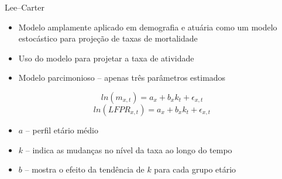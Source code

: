 \documentclass{beamer}
\begin{document}
\begin{frame}{Lee--Carter}
	\begin{itemize}
		\item{Modelo amplamente aplicado em demografia e atuária como um modelo estocástico para projeção de taxas de mortalidade}
		\item{Uso do modelo para projetar a taxa de atividade}
		\item{Modelo parcimonioso -- apenas três parâmetros estimados}
	\end{itemize} 
	\begin{equation}
  		ln(m_{x,t}) = a_{x}+b_{x}k_{t} + \epsilon_{x,t}
	\end{equation}
	\begin{equation}
  		ln(LFPR_{x,t}) = a_{x}+b_{x}k_{t} + \epsilon_{x,t}
	\end{equation}
	\begin{itemize}
		\item{$a$ -- perfil etário médio}
		\item{$k$ -- indica as mudanças no nível da taxa ao longo do tempo}
		\item{$b$ -- mostra o efeito da tendência de $k$ para cada grupo etário}
	\end{itemize}
\end{frame}
\end{document}
